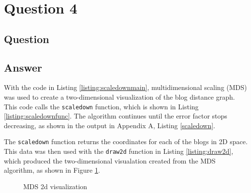 \section{Question 4}

\subsection{Question}


\subsection{Answer}

With the code in Listing \ref{listing:scaledownmain}, multidimensional scaling (MDS) was used to create a two-dimensional visualization of the blog distance graph. This code calls the {\tt scaledown} function, which is shown in Listing \ref{listing:scaledownfunc}. The algorithm continues until the error factor stops decreasing, as shown in the output in Appendix A, Listing \ref{scaledown}. 





The {\tt scaledown} function returns the coordinates for each of the blogs in 2D space. This data was then used with the {\tt draw2d} function in Listing \ref{listing:draw2d}, which produced the two-dimensional visualation created from the MDS algorithm, as shown in Figure \ref{fig:blogs2d}.



\begin{figure}[h!]
\centering
{}
\caption{MDS 2d visualization}
\label{fig:blogs2d}
\end{figure}